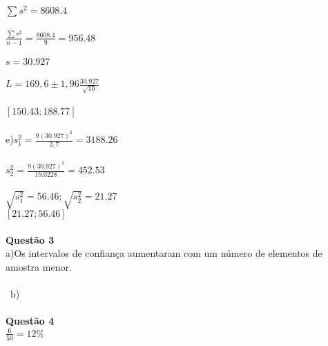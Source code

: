 \documentclass{article}
\begin{document}
\\\\
$\sum s^2 =8608.4$\\\\
$\frac{\sum s^2}{n-1} =\frac{8608.4}{9}=956.48$\\\\
$s=30.927$\\\\
$L=169,6 \pm 1,96\frac{30.927}{\sqrt{10}}$\\\\
$[150.43;188.77]$
\\\\
e)$s_1^2=\frac{9(30.927)^2}{2,7}=3188.26$\\\\
$s_2^2=\frac{9(30.927)^2}{19.0228}=452.53$\\\\
$\sqrt{s_1^2}=56.46;\sqrt{s_2^2}=21.27$\\
$[21.27;56.46]$\\\\
\textbf{Quest\~ao 3}\\
a)Os intervalos de confian\c{c}a aumentaram com um n\'umero de elementos de amostra menor.\\\\\
b)
\\\\
\textbf{Quest\~ao 4}\\
$\frac{6}{50}=12\%$
\end{document}
